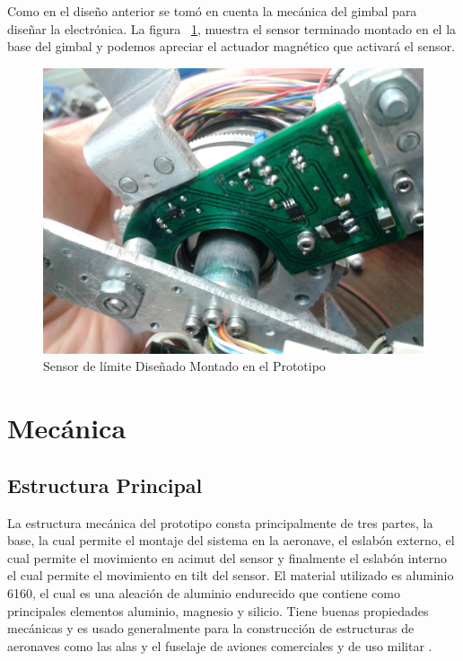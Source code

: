 Como en el dise\~{n}o anterior se tom\'{o} en cuenta la mec\'{a}nica del gimbal para dise\~{n}ar la electr\'{o}nica. La figura ~\ref{fig:SenPan}, muestra el sensor terminado montado en el la base del gimbal y podemos apreciar el actuador magn\'{e}tico que activar\'{a} el sensor. 

\begin{figure}[H]
\centering \includegraphics[scale=0.093]{img/SenPan.jpg}
\caption{Sensor de l\'{i}mite Dise\~{n}ado Montado en el Prototipo}
\label{fig:SenPan}
\end{figure}

  
\section{Mec\'anica}

\subsection{Estructura Principal}

La estructura mec\'{a}nica del prototipo consta principalmente de tres partes, la base, la cual permite el montaje del sistema en la aeronave, el eslab\'{o}n externo, el cual permite el movimiento en acimut del sensor  y finalmente el eslab\'{o}n interno el cual permite el movimiento en tilt del sensor. El material utilizado es aluminio 6160, el cual es una aleaci\'{o}n de aluminio endurecido que contiene como principales elementos aluminio, magnesio y silicio.  Tiene buenas propiedades mec\'{a}nicas y es usado generalmente para la construcci\'{o}n de estructuras de aeronaves como las alas y el fuselaje de aviones comerciales y de uso militar \cite{28}. 

